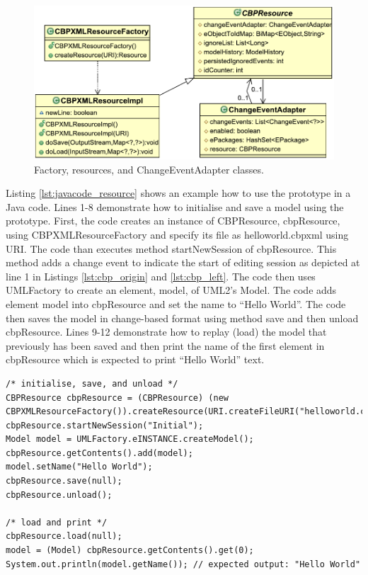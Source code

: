 \begin{figure}[th]
  \centering
  \includegraphics[width=\linewidth]{resources}
  \caption{Factory, resources, and ChangeEventAdapter classes.}
  \label{fig:resources}
\end{figure}

Listing \ref{lst:javacode_resource} shows an example how to use the prototype in a Java code. Lines 1-8 demonstrate how to initialise and save a model using the prototype. First, the code creates an instance of \textsf{CBPResource}, \textsf{cbpResource}, using \textsf{CBPXMLResourceFactory} and specify its file as \textsf{helloworld.cbpxml} using \textsf{URI}. The code than executes method \textsf{startNewSession} of \textsf{cbpResource}. This method adds a change event to indicate the start of editing session as depicted at line 1 in Listings \ref{lst:cbp_origin} and \ref{lst:cbp_left}.
The code then uses \textsf{UMLFactory} to create an element, \textsf{model}, of UML2's \textsf{Model}. The code adds element \textsf{model} into \textsf{cbpResource} and set the name to ``Hello World''. The code then saves the model in change-based format using method \textsf{save} and then unload \textsf{cbpResource}. Lines 9-12 demonstrate how to replay (load) the model that previously has been saved and then print the name of the first element in \textsf{cbpResource} which is expected to print ``Hello World'' text.

\vspace{-20pt}
\begin{lstlisting}[style=java,caption={An example how to use \textsf{CBPResource} in Java code.},label=lst:javacode_resource]
/* initialise, save, and unload */
CBPResource cbpResource = (CBPResource) (new CBPXMLResourceFactory()).createResource(URI.createFileURI("helloworld.cbpxml"));
cbpResource.startNewSession("Initial");
Model model = UMLFactory.eINSTANCE.createModel();
cbpResource.getContents().add(model);
model.setName("Hello World");
cbpResource.save(null);
cbpResource.unload();

/* load and print */
cbpResource.load(null);
model = (Model) cbpResource.getContents().get(0);
System.out.println(model.getName()); // expected output: "Hello World"
\end{lstlisting}

